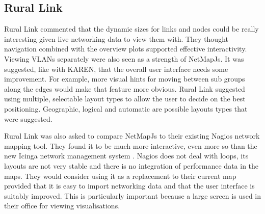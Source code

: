 \documentclass[11pt, a4paper]{article}
\begin{document}

\subsection{Rural Link}

Rural Link commented that the dynamic sizes for links and nodes could be really
interesting given live networking data to view them with. They thought
navigation combined with the overview plots supported effective interactivity.
Viewing VLANs separately were also seen as a strength of NetMapJs. It was
suggested, like with KAREN, that the overall user interface needs some
improvement. For example, more visual hints for moving between sub groups along
the edges would make that feature more obvious. Rural Link suggested using
multiple, selectable layout types to allow the user to decide on the best
positioning. Geographic, logical and automatic are possible layouts types that
were suggested.

Rural Link was also asked to compare NetMapJs to their existing Nagios network
mapping tool. They found it to be much more interactive, even more so than the
new Icinga network management system \cite{Icinga_website}. Nagios does not deal
with loops, its layouts are not very stable and there is no integration of
performance data in the maps. They would consider using it as a replacement to
their current map provided that it is easy to import networking data and that
the user interface is suitably improved. This is particularly important because
a large screen is used in their office for viewing visualisations. 
\end{document}
